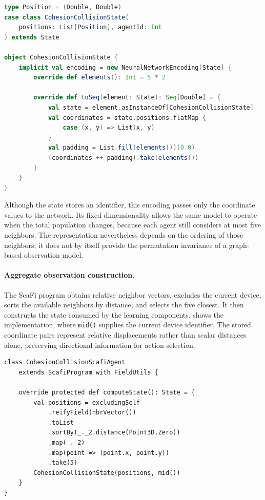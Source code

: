 \begin{lstlisting}[language=scala,breaklines=true,float=tbp,
  caption={State representation and fixed-size encoding for five neighbors.},
  label={lst:scarlib-encoding}]
type Position = (Double, Double)
case class CohesionCollisionState(
    positions: List[Position], agentId: Int
) extends State

object CohesionCollisionState {
    implicit val encoding = new NeuralNetworkEncoding[State] {
        override def elements(): Int = 5 * 2

        override def toSeq(element: State): Seq[Double] = {
            val state = element.asInstanceOf[CohesionCollisionState]
            val coordinates = state.positions.flatMap {
                case (x, y) => List(x, y)
            }
            val padding = List.fill(elements())(0.0)
            (coordinates ++ padding).take(elements())
        }
    }
}
\end{lstlisting}

Although the state stores an identifier, this encoding passes only the
 coordinate values to the network.
%
Its fixed dimensionality allows the same model to operate when the total
 population changes, because each agent still considers at most five
 neighbors.
%
The representation nevertheless depends on the ordering of those neighbors;
 it does not by itself provide the permutation invariance of a graph-based
 observation model.

\paragraph{Aggregate observation construction.}
The ScaFi program obtains relative neighbor vectors, excludes the current
 device, sorts the available neighbors by distance, and selects the five
 closest.
%
It then constructs the state consumed by the learning components.
%
 shows the implementation, where
 \texttt{mid()} supplies the current device identifier.
%
The stored coordinate pairs represent relative displacements rather than
 scalar distances alone, preserving directional information for action selection.

\begin{lstlisting}[language=scafi,breaklines=true,float=tbp,
  caption={Aggregate construction of the local observation.},
  label={lst:scarlib-observation}]
class CohesionCollisionScafiAgent
    extends ScafiProgram with FieldUtils {

    override protected def computeState(): State = {
        val positions = excludingSelf
            .reifyField(nbrVector())
            .toList
            .sortBy(_._2.distance(Point3D.Zero))
            .map(_._2)
            .map(point => (point.x, point.y))
            .take(5)
        CohesionCollisionState(positions, mid())
    }
}
\end{lstlisting}

